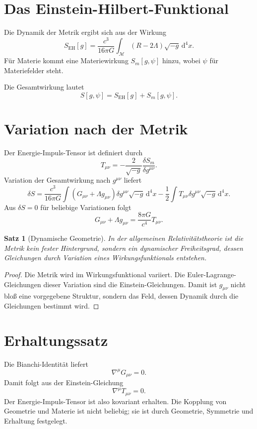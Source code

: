 \documentclass[11pt,a4paper]{book}
\newtheorem{satz}{Satz}[chapter]
\theoremstyle{remark}
\newcommand{\M}{\mathcal{M}}
\newcommand{\diff}{\mathrm{d}}
\begin{document}
\section{Das Einstein-Hilbert-Funktional}
Die Dynamik der Metrik ergibt sich aus der Wirkung
\begin{equation}
S_{\mathrm{EH}}[g]=\frac{c^3}{16\pi G}\int_\M (R-2\Lambda)\sqrt{-g}\,\diff^4x.
\end{equation}
Für Materie kommt eine Materiewirkung $S_m[g,\psi]$ hinzu, wobei $\psi$ für Materiefelder steht.

Die Gesamtwirkung lautet
\begin{equation}
S[g,\psi]=S_{\mathrm{EH}}[g]+S_m[g,\psi].
\end{equation}

\section{Variation nach der Metrik}
Der Energie-Impuls-Tensor ist definiert durch
\begin{equation}
T_{\mu\nu}=-\frac{2}{\sqrt{-g}}\frac{\delta S_m}{\delta g^{\mu\nu}}.
\end{equation}
Variation der Gesamtwirkung nach $g^{\mu\nu}$ liefert
\begin{equation}
\delta S = \frac{c^3}{16\pi G}\int (G_{\mu\nu}+\Lambda g_{\mu\nu})\delta g^{\mu\nu}\sqrt{-g}\,\diff^4x -\frac{1}{2}\int T_{\mu\nu}\delta g^{\mu\nu}\sqrt{-g}\,\diff^4x.
\end{equation}
Aus $\delta S=0$ für beliebige Variationen folgt
\begin{equation}
G_{\mu\nu}+\Lambda g_{\mu\nu}=\frac{8\pi G}{c^4}T_{\mu\nu}.
\end{equation}

\begin{satz}[Dynamische Geometrie]
In der allgemeinen Relativitätstheorie ist die Metrik kein fester Hintergrund, sondern ein dynamischer Freiheitsgrad, dessen Gleichungen durch Variation eines Wirkungsfunktionals entstehen.
\end{satz}

\begin{proof}
Die Metrik wird im Wirkungsfunktional variiert. Die Euler-Lagrange-Gleichungen dieser Variation sind die Einstein-Gleichungen. Damit ist $g_{\mu\nu}$ nicht bloß eine vorgegebene Struktur, sondern das Feld, dessen Dynamik durch die Gleichungen bestimmt wird.
\end{proof}

\section{Erhaltungssatz}
Die Bianchi-Identität liefert
\begin{equation}
\nabla^\mu G_{\mu\nu}=0.
\end{equation}
Damit folgt aus der Einstein-Gleichung
\begin{equation}
\nabla^\mu T_{\mu\nu}=0.
\end{equation}
Der Energie-Impuls-Tensor ist also kovariant erhalten. Die Kopplung von Geometrie und Materie ist nicht beliebig; sie ist durch Geometrie, Symmetrie und Erhaltung festgelegt.
\end{document}
